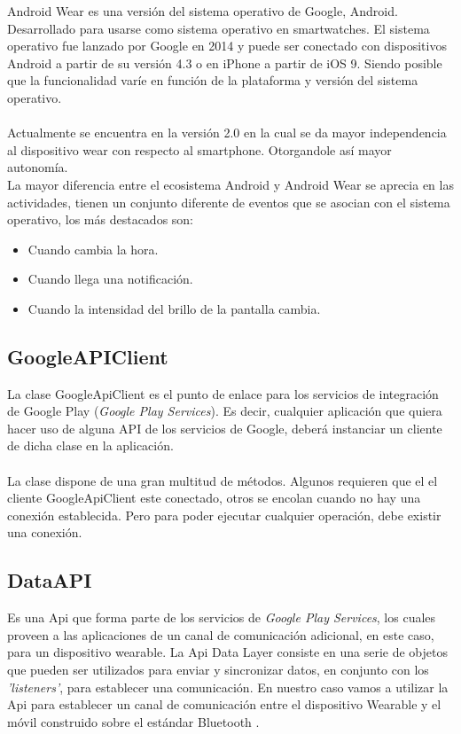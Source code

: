 Android Wear es una versión del sistema operativo de Google, Android. Desarrollado para usarse como sistema operativo en smartwatches. El sistema operativo fue lanzado por Google en 2014 y puede ser conectado con dispositivos Android a partir de su versión 4.3 o en iPhone a partir de iOS 9. Siendo posible que la funcionalidad varíe en función de la plataforma y versión del sistema operativo.
\\
\\
Actualmente se encuentra en la versión 2.0 en la cual se da mayor independencia al dispositivo wear con respecto al smartphone. Otorgandole así mayor autonomía.
\\
La mayor diferencia entre el ecosistema Android y Android Wear se aprecia en las actividades, tienen un conjunto diferente de eventos que se asocian con el sistema operativo, los más destacados son:
\begin{itemize}
\item Cuando cambia la hora.
\item Cuando llega una notificación.
\item Cuando la intensidad del brillo de la pantalla cambia.
\end{itemize}

\subsection{GoogleAPIClient}
La clase GoogleApiClient es el punto de enlace para los servicios de integración de Google Play (\textit{Google Play Services}). Es decir, cualquier aplicación que quiera hacer uso de alguna API de los servicios de Google, deberá instanciar un cliente de dicha clase en la aplicación.
\\
\\
La clase dispone de una gran multitud de métodos. Algunos requieren que el el cliente GoogleApiClient este conectado, otros se encolan cuando no hay una conexión establecida. Pero para poder ejecutar cualquier operación, debe existir una conexión\cite{GoogleApiClient}.
\subsection{DataAPI}

Es una Api que forma parte de los servicios de \textit{Google Play Services}, los cuales proveen a las aplicaciones de un canal de comunicación adicional, en este caso, para un dispositivo wearable.
La Api Data Layer consiste en una serie de objetos que pueden ser utilizados para enviar y sincronizar datos, en conjunto con los \textit{'listeners'}, para establecer una comunicación.
En nuestro caso vamos a utilizar la Api para establecer un canal de comunicación entre el dispositivo Wearable y el móvil construido sobre el estándar Bluetooth \cite{DataAPI}.

